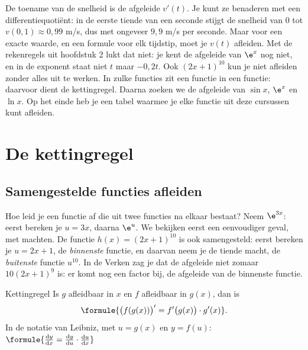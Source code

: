 De toename van de snelheid is de afgeleide $v'(t)$. Je kunt ze benaderen met een differentiequotiënt: in de eerste tiende van een seconde stijgt de snelheid van $0$ tot $v(0{,}1) \approx 0{,}99$ m/s, dus met ongeveer $9{,}9$ m/s per seconde. Maar voor een exacte waarde, en een formule voor elk tijdstip, moet je $v(t)$ afleiden. Met de rekenregels uit hoofdstuk 2 lukt dat niet: je kent de afgeleide van $\e^x$ nog niet, en in de exponent staat niet $t$ maar $-0{,}2t$. Ook $(2x + 1)^{10}$ kun je niet afleiden zonder alles uit te werken. In zulke functies zit een functie in een functie: daarvoor dient de kettingregel. Daarna zoeken we de afgeleide van $\sin x$, $\e^x$ en $\ln x$. Op het einde heb je een tabel waarmee je elke functie uit deze cursussen kunt afleiden.

\begin{oefeningen}[Start]

\end{oefeningen}

\section{De kettingregel}

\subsection{Samengestelde functies afleiden}

Hoe leid je een functie af die uit twee functies na elkaar bestaat? Neem $\e^{3x}$: eerst bereken je $u = 3x$, daarna $\e^u$. We bekijken eerst een eenvoudiger geval, met machten. De functie $h(x) = (2x + 1)^{10}$ is ook samengesteld: eerst bereken je $u = 2x + 1$, de \textit{binnenste} functie, en daarvan neem je de tiende macht, de \textit{buitenste} functie $u^{10}$. In de Verken zag je dat de afgeleide niet zomaar $10(2x + 1)^9$ is: er komt nog een factor bij, de afgeleide van de binnenste functie.

\begin{theorie}
\begin{stelling}{Kettingregel}
Is $g$ afleidbaar in $x$ en $f$ afleidbaar in $g(x)$, dan is
\[\formule{\bigl(f(g(x))\bigr)' = f'\bigl(g(x)\bigr) \cdot g'(x)}.\]
In de notatie van Leibniz, met $u = g(x)$ en $y = f(u)$: \qquad $\formule{\frac{\mathrm{d}y}{\mathrm{d}x} = \frac{\mathrm{d}y}{\mathrm{d}u} \cdot \frac{\mathrm{d}u}{\mathrm{d}x}}$
\end{stelling}
\end{theorie}

